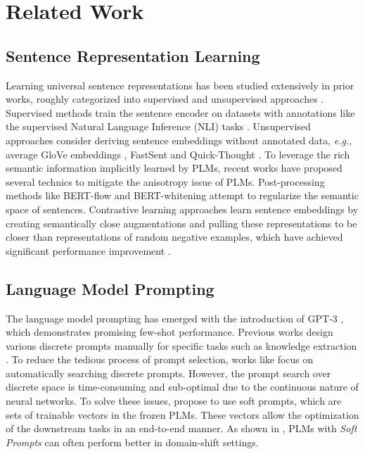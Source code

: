 \documentclass[11pt]{article}
\begin{document}
\section{Related Work}

\subsection{Sentence Representation Learning}
Learning universal sentence representations has been studied extensively in prior works, roughly categorized into supervised \cite{ConneauK18senteval, CerYKHLJCGYTSK18} and unsupervised approaches \cite{HillCK16, li20bertflow}. Supervised methods train the sentence encoder on datasets with annotations like the supervised Natural Language Inference (NLI) tasks \cite{CerYKHLJCGYTSK18, ReimersG19sbert}. Unsupervised approaches consider deriving sentence embeddings without annotated data, \textit{e.g.}, average GloVe embeddings \cite{glove}, FastSent \cite{HillCK16} and Quick-Thought \cite{LogeswaranL18}. To leverage the rich semantic information implicitly learned by PLMs, recent works have proposed several technics to mitigate the anisotropy issue \cite{DBLP:conf/emnlp/Ethayarajh19, li20bertflow} of PLMs. Post-processing methods like BERT-flow \cite{li20bertflow} and BERT-whitening \cite{su2021whitening} attempt to regularize the semantic space of sentences. Contrastive learning approaches learn sentence embeddings by creating semantically close augmentations and pulling these representations to be closer than representations of random negative examples, which have achieved significant performance improvement \cite{Yan2021consert, liu2021mirrorbert, giorgi-etal-2021-declutr, gao2021simcse, 2022promptbert, shou-etal-2022-amr, zhou-etal-2022-dclr, zhang-etal-2022-arccse, chuang2022diffcse}. 


\subsection{Language Model Prompting}
The language model prompting has emerged with the introduction of GPT-3 \cite{gpt3}, which demonstrates promising few-shot performance. Previous works design various discrete prompts manually for specific tasks such as knowledge extraction \cite{DBLP:conf/emnlp/PetroniRRLBWM19}. To
reduce the tedious process of prompt selection, works like \cite{schick2020exploiting, schick2020s, shin2020autoprompt} focus on automatically searching discrete prompts. However, the prompt search over discrete space is time-consuming and sub-optimal due to the continuous nature of neural networks. To solve these issues, \cite{Lester21sacle, li2021prefix, zhong2021factual, liu2021ptuningv2} propose to use soft prompts, which are sets of trainable vectors in the frozen PLMs. These vectors allow the optimization of the downstream tasks in an end-to-end manner. As shown in \cite{Lester21sacle}, PLMs with \textit{Soft Prompts} can often perform better in domain-shift settings.
\end{document}
